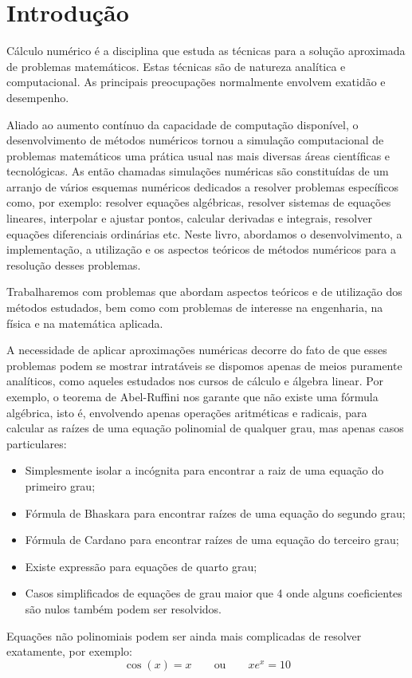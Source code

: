 
\chapter{Introdução}

Cálculo numérico é a disciplina que estuda as técnicas para a solução aproximada de problemas matemáticos. Estas técnicas são de natureza analítica e computacional. As principais preocupações normalmente envolvem exatidão e desempenho.

Aliado ao aumento contínuo da capacidade de computação disponível, o desenvolvimento de métodos numéricos tornou a simulação computacional de problemas matemáticos uma prática usual nas mais diversas áreas científicas e tecnológicas. As então chamadas simulações numéricas são constituídas de um arranjo de vários esquemas numéricos dedicados a resolver problemas específicos como, por exemplo: resolver equações algébricas, resolver sistemas de equações lineares, interpolar e ajustar pontos, calcular derivadas e integrais, resolver equações diferenciais ordinárias etc. Neste livro, abordamos o desenvolvimento, a implementação, a utilização e os aspectos teóricos de métodos numéricos para a resolução desses problemas.

Trabalharemos com problemas que abordam aspectos teóricos e de utilização dos métodos estudados, bem como com problemas de interesse na engenharia, na física e na matemática aplicada.

A necessidade de aplicar aproximações numéricas decorre do fato de que esses problemas podem se mostrar intratáveis se dispomos apenas de meios puramente analíticos, como aqueles estudados nos cursos de cálculo e álgebra linear. Por exemplo, o teorema de Abel-Ruffini nos garante que não existe uma fórmula algébrica, isto é, envolvendo apenas operações aritméticas e radicais, para calcular as raízes de uma equação polinomial de qualquer grau, mas apenas casos particulares:
\begin{itemize}
\item Simplesmente isolar a incógnita para encontrar a raiz de uma equação do primeiro grau;
\item Fórmula de Bhaskara para encontrar raízes de uma equação do segundo grau;
\item Fórmula de Cardano para encontrar raízes de uma equação do terceiro grau;
\item Existe expressão para equações de quarto grau;
\item Casos simplificados de equações de grau maior que 4 onde alguns coeficientes são nulos também podem ser resolvidos.
\end{itemize}
Equações não polinomiais podem ser ainda mais complicadas de resolver exatamente, por exemplo:
\begin{equation}
\cos(x)=x\qquad \text{ou}\qquad xe^x= 10
\end{equation}

